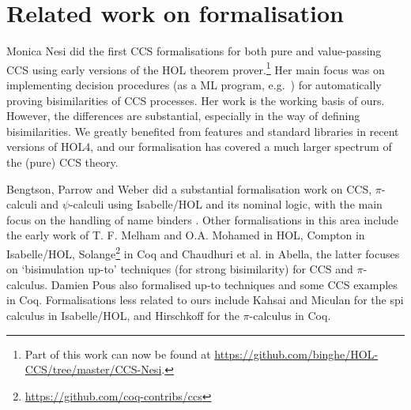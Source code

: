 \section{Related work on formalisation}
\label{s:rel}

Monica Nesi did the first CCS formalisations for both pure and
value-passing CCS \cite{Nesi:1992ve,Nesi:2017wo} using early versions of the HOL
theorem prover.\footnote{Part of this work can now be found at
  \url{https://github.com/binghe/HOL-CCS/tree/master/CCS-Nesi}.}
Her main focus was on implementing decision procedures (as a ML
program, e.g.~\cite{cleaveland1993concurrency}) for
automatically proving bisimilarities of CCS
processes. %
Her work is
  the working basis of ours. However, the differences are substantial, especially in the way of defining
bisimilarities. We greatly benefited from features and standard
libraries in recent versions of HOL4, and our formalisation has
covered a much larger spectrum of the (pure) CCS theory.

Bengtson, Parrow and Weber did a substantial formalisation work
on CCS, $\pi$-calculi
and $\psi$-calculi 
using Isabelle/HOL and its nominal logic, with the main focus on the handling of
name binders \cite{bengtson2007completeness,parrow2009formalising}.
%
Other formalisations in this area include the early work of T. F. Melham
\cite{melham1994mechanized} and O.A. Mohamed
\cite{mohamed1995mechanizing} in HOL, Compton
\cite{compton2005embedding} in Isabelle/HOL,
Solange\footnote{\url{https://github.com/coq-contribs/ccs}} in Coq
and Chaudhuri et al.\;\cite{chaudhuri2015lightweight} in Abella, the latter
focuses on `bisimulation up-to' techniques (for strong bisimilarity)
for CCS and $\pi$-calculus.
Damien Pous \cite{pous2007new} also formalised up-to techniques and some CCS examples in
Coq.
Formalisations less related to ours
include Kahsai and Miculan \cite{kahsai2008implementing} for the spi
calculus in Isabelle/HOL, and Hirschkoff \cite{hirschkoff1997full} for the $\pi$-calculus in Coq.

